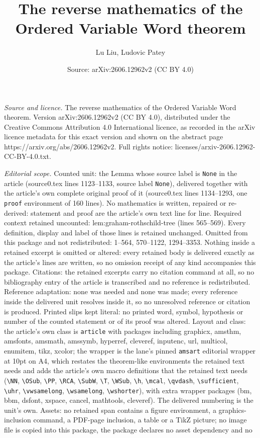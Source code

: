 \documentclass[10pt,a4paper]{amsart}
\title[The reverse mathematics of the Ordered Variable Word theorem]{The reverse mathematics of the Ordered Variable Word theorem}
\author{Lu Liu, Ludovic Patey}
\date{Source: arXiv:2606.12962v2 (CC BY 4.0)}
\begin{document}
\maketitle

\noindent\emph{Source and licence.} The reverse mathematics of the Ordered Variable Word theorem. Version arXiv:2606.12962v2 (CC BY 4.0), distributed under the Creative Commons Attribution 4.0 International licence, as recorded in the arXiv licence metadata for this exact version and shown on the abstract page https://arxiv.org/abs/2606.12962v2. Full rights notice: licenses/arxiv-2606.12962-CC-BY-4.0.txt.\par\smallskip

\noindent\textit{Editorial scope.} Counted unit: the Lemma whose source label is \texttt{None} in the article (source0.tex lines 1123--1133, source label \texttt{None}), delivered together with the article's own complete original proof of it (source0.tex lines 1134--1293, one \texttt{proof} environment of 160 lines). No mathematics is written, repaired or re-derived: statement and proof are the article's own text line for line. Required context retained uncounted: lem:graham-rothschild-tree (lines 565--569). Every definition, display and label of those lines is retained unchanged. Omitted from this package and not redistributed: 1--564, 570--1122, 1294--3353. Nothing inside a retained excerpt is omitted or altered: every retained body is delivered exactly as the article's lines are written, so no omission receipt of any kind accompanies this package. Citations: the retained excerpts carry no citation command at all, so no bibliography entry of the article is transcribed and no reference is redistributed. Reference adaptation: none was needed and none was made; every reference inside the delivered unit resolves inside it, so no unresolved reference or citation is produced. Printed slips kept literal: no printed word, symbol, hypothesis or number of the counted statement or of its proof was altered. Layout and class: the article's own class is \texttt{article} with packages including graphicx, amsthm, amsfonts, amsmath, amssymb, hyperref, cleveref, inputenc, url, multicol, enumitem, tikz, xcolor; the wrapper is the lane's pinned \texttt{amsart} editorial wrapper at 10pt on A4, which restates the theorem-like environments the retained text needs and adds the article's own macro definitions that the retained text needs (\texttt{\textbackslash NN}, \texttt{\textbackslash OSub}, \texttt{\textbackslash PP}, \texttt{\textbackslash RCA}, \texttt{\textbackslash SubW}, \texttt{\textbackslash T}, \texttt{\textbackslash WSub}, \texttt{\textbackslash h}, \texttt{\textbackslash mcal}, \texttt{\textbackslash qvdash}, \texttt{\textbackslash sufficient}, \texttt{\textbackslash uhr}, \texttt{\textbackslash vwsamelong}, \texttt{\textbackslash wsamelong}, \texttt{\textbackslash wshorter}), with extra wrapper packages (bm, bbm, dsfont, xspace, cancel, mathtools, cleveref). The delivered numbering is the unit's own. Assets: no retained span contains a figure environment, a graphics-inclusion command, a PDF-page inclusion, a table or a TikZ picture; no image file is copied into this package, the package declares no asset dependency and no 
\end{document}
